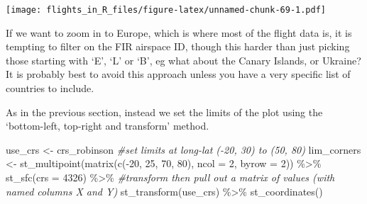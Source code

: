 \documentclass[
]{book}
\newenvironment{Shaded}{\begin{snugshade}}{\end{snugshade}}
\newcommand{\AttributeTok}[1]{\textcolor[rgb]{0.77,0.63,0.00}{#1}}
\newcommand{\CommentTok}[1]{\textcolor[rgb]{0.56,0.35,0.01}{\textit{#1}}}
\newcommand{\DecValTok}[1]{\textcolor[rgb]{0.00,0.00,0.81}{#1}}
\newcommand{\FunctionTok}[1]{\textcolor[rgb]{0.00,0.00,0.00}{#1}}
\newcommand{\NormalTok}[1]{#1}
\newcommand{\OtherTok}[1]{\textcolor[rgb]{0.56,0.35,0.01}{#1}}
\newcommand{\SpecialCharTok}[1]{\textcolor[rgb]{0.00,0.00,0.00}{#1}}
\begin{document}
\texttt{[image: flights\_in\_R\_files/figure-latex/unnamed-chunk-69-1.pdf]}

If we want to zoom in to Europe, which is where most of the flight data is, it is tempting to filter on the FIR airspace ID, though this harder than just picking those starting with `E', `L' or `B', eg what about the Canary Islands, or Ukraine? It is probably best to avoid this approach unless you have a very specific list of countries to include.

As in the previous section, instead we set the limits of the plot using the `bottom-left, top-right and transform' method.

\begin{Shaded}
\begin{Highlighting}[]
\NormalTok{use\_crs }\OtherTok{\textless{}{-}}\NormalTok{ crs\_robinson}
\CommentTok{\#set limits at long{-}lat ({-}20, 30) to (50, 80)}
\NormalTok{lim\_corners }\OtherTok{\textless{}{-}} \FunctionTok{st\_multipoint}\NormalTok{(}\FunctionTok{matrix}\NormalTok{(}\FunctionTok{c}\NormalTok{(}\SpecialCharTok{{-}}\DecValTok{20}\NormalTok{, }\DecValTok{25}\NormalTok{, }\DecValTok{70}\NormalTok{, }\DecValTok{80}\NormalTok{), }\AttributeTok{ncol =} \DecValTok{2}\NormalTok{, }\AttributeTok{byrow =} \DecValTok{2}\NormalTok{)) }\SpecialCharTok{\%\textgreater{}\%} 
  \FunctionTok{st\_sfc}\NormalTok{(}\AttributeTok{crs =} \DecValTok{4326}\NormalTok{) }\SpecialCharTok{\%\textgreater{}\%} 
  \CommentTok{\#transform then pull out a matrix of values (with named columns X and Y)}
  \FunctionTok{st\_transform}\NormalTok{(use\_crs) }\SpecialCharTok{\%\textgreater{}\%} 
  \FunctionTok{st\_coordinates}\NormalTok{()}


\end{Highlighting}
\end{Shaded}
\end{document}
